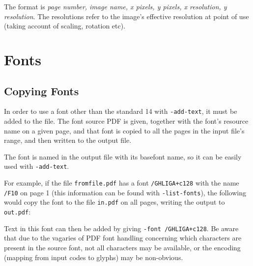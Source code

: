 \documentclass{book}
\begin{document}
  \noindent The format is \textit{page number, image name, x pixels, y pixels, x resolution, y resolution}. The resolutions refer to the image's effective resolution at point of use (taking account of scaling, rotation etc).



\pagestyle{empty}

\chapter{Fonts}\pagestyle{fancy}

\noindent{}

\section{Copying Fonts}
\label{copyfont}

In order to use a font other than the standard 14 with \verb!-add-text!, it
must be added to the file. The font source PDF is given, together with the
font's resource name on a given page, and that font is copied to all the pages
in the input file's range, and then written to the output file.

The font is named in the output file with its basefont name, so it can be
easily used with \verb!-add-text!.

For example, if the file \verb!fromfile.pdf! has a font \verb!/GHLIGA+c128! with
the name \verb!/F10! on page 1 (this information can be found with
\verb!-list-fonts!), the following would copy the font to the file
\verb!in.pdf! on all pages, writing the output to \verb!out.pdf!:

\noindent{}

\noindent Text in this font can then be added by giving \verb!-font /GHLIGA+c128!. Be
aware that due to the vagaries of PDF font handling concerning which characters
are present in the source font, not all characters may be available, or the
encoding (mapping from input codes to glyphs) may be non-obvious.
\end{document}
